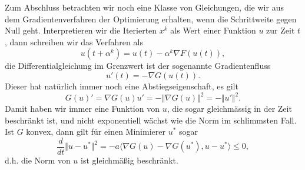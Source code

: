 Zum Abschluss betrachten wir noch eine Klasse von Gleichungen, die wir aus dem Gradientenverfahren der Optimierung erhalten, wenn die Schrittweite gegen Null geht. Interpretieren wir die Iterierten $x^k$ als Wert einer Funktion $u$ zur Zeit $t$, dann schreiben wir das Verfahren als
$$ u(t+\alpha^k ) = u(t) - \alpha^k \nabla F(u(t)), $$
die Differentialgleichung im Grenzwert ist der sogenannte Gradientenfluss
$$ u'(t) = - \nabla G(u(t)). $$
Dieser hat natürlich immer noch eine Abstiegseigenschaft, es gilt 
$$ G(u)' =   \nabla G(u) u' = - \Vert \nabla G(u) \Vert^2 = - \Vert u'\Vert^2. $$ 
Damit haben wir immer eine Funktion von $u$, die sogar gleichmässig in der Zeit beschränkt ist, und nicht exponentiell wächst wie die Norm im schlimmsten Fall. Ist $G$ konvex, dann gilt für einen Minimierer $u^*$ sogar
$$ \frac{d}{dt} \Vert u - u^* \Vert^2 = - a \langle \nabla G(u) - \nabla G(u^*), u - u^* \rangle \leq 0, $$
d.h. die Norm von $u$ ist gleichmä{\ss}ig beschränkt. 
%
%
%
